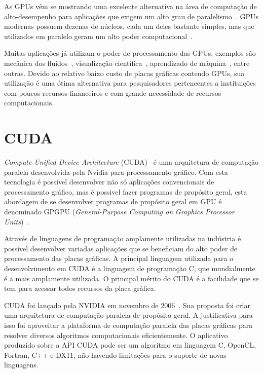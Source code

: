 As GPUs vêm se mostrando uma excelente alternativa na área de computação de alto-desempenho para aplicações que exigem um alto grau de paralelismo~\citep{gpu}. GPUs modernas possuem dezenas de núcleos, cada um deles bastante simples, mas que utilizados em paralelo geram um alto poder computacional~\citep{cuda}.

Muitas aplicações já utilizam o poder de processamento das GPUs, exemplos são mecânica dos fluidos~\citep{fluido}, visualização científica~\citep{visualizacao},  aprendizado de máquina~\citep{Aprendizado}, entre outras. Devido ao relativo baixo custo de placas gráficas contendo GPUs, sua utilização é uma ótima alternativa para pesquisadores pertencentes a instituições com poucos recursos financeiros e com grande necessidade de recursos computacionais.


\section{CUDA}\label{intro:contexto}

\textit{Compute Unified Device Architecture} (CUDA)~\citep{cuda} é uma arquitetura de computação paralela desenvolvida pela Nvidia para processamento gráfico.
Com esta tecnologia é possível desenvolver não só aplicações convencionais de processamento gráfico, mas é possivel fazer programas de propósito geral, esta abordagem de se desenvolver programas de propósito geral em GPU é denominado GPGPU (\textit{General-Purpose Computing on Graphics Processor Units})~\citep{GPGPU}.

Através de linguagens de programação amplamente utilizadas na indústria é possível desenvolver variadas aplicações que se beneficiam do alto poder de processamento das placas gráficas. A principal linguagem utilizada para o desenvolvimento em CUDA é a linguagem de
programação C, que mundialmente é a mais amplamente utilizada. O principal mérito do CUDA é a facilidade que se tem para acessar todos recursos da placa gráfica.

CUDA foi lançado pela NVIDIA em novembro de 2006~\citep{cuda}. Sua proposta foi criar uma arquitetura de computação paralela de propósito geral. A justificativa para isso foi aproveitar a plataforma de computação paralela das placas gráficas para resolver diversos algoritmos
computacionais eficientemente. O aplicativo produzido sobre a API CUDA pode ser um algoritmo em linguagem C, OpenCL, Fortran, C++ e DX11, não havendo limitações para o suporte de novas linguagens. 

